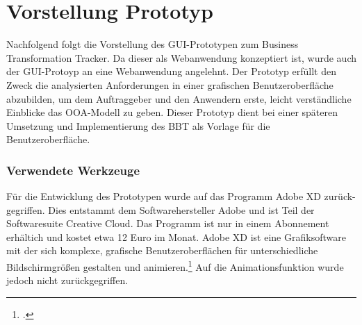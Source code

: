\section{Vorstellung Prototyp}
Nachfolgend folgt die Vorstellung des GUI-Prototypen zum Business Transformation Tracker. Da dieser als Webanwendung konzeptiert ist, wurde auch der GUI-Protoyp an eine Webanwendung angelehnt. Der Prototyp erfüllt den Zweck die analysierten Anforderungen in einer grafischen Benutzeroberfläche abzubilden, um dem Auftraggeber und den Anwendern erste, leicht verständliche Einblicke das OOA-Modell zu geben. Dieser Prototyp dient bei einer späteren Umsetzung und Implementierung des BBT als Vorlage für die Benutzeroberfläche.

\subsubsection{Verwendete Werkzeuge}
Für die Entwicklung des Prototypen wurde auf das Programm Adobe XD zurück-gegriffen. Dies entstammt dem Softwarehersteller Adobe und ist Teil der Softwaresuite \glqq{}Creative Cloud\grqq{}. Das Programm ist nur in einem Abonnement erhältich und kostet etwa 12 Euro im Monat. Adobe XD ist eine Grafiksoftware mit der sich komplexe, grafische Benutzeroberflächen für unterschiedliche Bildschirmgrößen gestalten und animieren.\footcite[Vgl.][]{adobe} Auf die Animationsfunktion wurde jedoch nicht zurückgegriffen.

